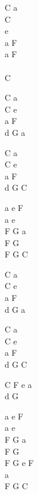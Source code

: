 \begin{chord}
    C a\\
    C\\
    e\\
    a F\\
    a F\\
    ~\\
    C

    C a\\
    C e\\
    a F\\
    d G a

    C a\\
    C e\\
    a F\\
    d G C

    a e F\\
    a e\\
    F G a\\
    F G\\
    F G C

    C a\\
    C e\\
    a F\\
    d G a

    C a\\
    C e\\
    a F\\
    d G C

    C F e a\\
    d G

    a e F\\
    a e\\
    F G a\\
    F G\\
    F G e F\\
    a\\
    F G C
\end{chord}